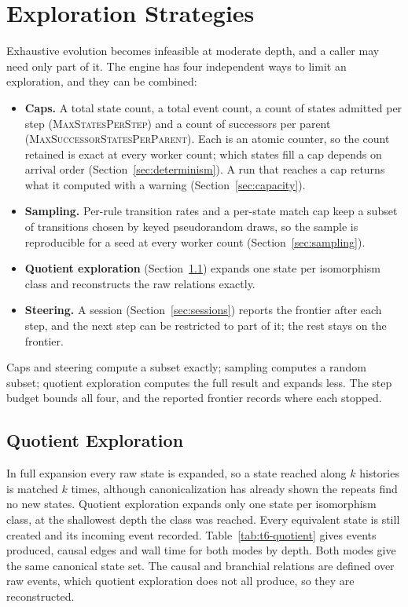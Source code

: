 \section{Exploration Strategies}
\label{sec:exploration}

Exhaustive evolution becomes infeasible at moderate depth, and a caller may need only part of
it. The engine has four independent ways to limit an exploration, and they can be combined:

\begin{itemize}
\item \textbf{Caps.} A total state count, a total event count, a count of states admitted per step
      (\textsc{MaxStatesPerStep}) and a count of successors per parent
      (\textsc{MaxSuccessorStatesPerParent}). Each is an atomic counter, so the count retained is
      exact at every worker count; which states fill a cap depends on arrival order
      (Section~\ref{sec:determinism}). A run that reaches a cap returns what it computed with a
      warning (Section~\ref{sec:capacity}).
\item \textbf{Sampling.} Per-rule transition rates and a per-state match cap keep a subset of
      transitions chosen by keyed pseudorandom draws, so the sample is reproducible for a seed at
      every worker count (Section~\ref{sec:sampling}).
\item \textbf{Quotient exploration} (Section~\ref{sec:quotient}) expands one state per isomorphism
      class and reconstructs the raw relations exactly.
\item \textbf{Steering.} A session (Section~\ref{sec:sessions}) reports the frontier after each
      step, and the next step can be restricted to part of it; the rest stays on the frontier.
\end{itemize}

Caps and steering compute a subset exactly; sampling computes a random subset; quotient exploration
computes the full result and expands less. The step budget bounds all four, and the reported
frontier records where each stopped.
\label{sec:pruning}

\subsection{Quotient Exploration}
\label{sec:quotient}

In full expansion every raw state is expanded, so a state reached along $k$ histories is matched $k$
times, although canonicalization has already shown the repeats find no new states. Quotient
exploration expands only one state per isomorphism class, at the shallowest depth the class was
reached. Every equivalent state is still created and its incoming event recorded.
Table~\ref{tab:t6-quotient} gives events produced, causal edges and wall time for both modes by
depth. Both modes give the same canonical state set. The causal and branchial relations are
defined over raw events, which quotient exploration does not all produce, so they are
reconstructed.

